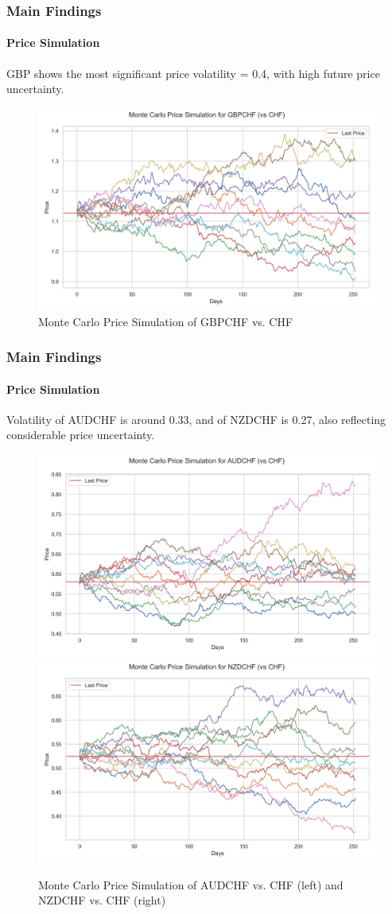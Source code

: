 \documentclass[10pt]{beamer}
\begin{document}
\begin{frame}
\frametitle{Main Findings}
\framesubtitle{Price Simulation}
GBP shows the most significant price volatility = 0.4, with high future price uncertainty.
\begin{figure}[h]
    \centering  \includegraphics[width=0.75\linewidth]{reports/figures/monte_carlo_price_simulation_GBPCHF_vs_CHF.png}
    \caption{Monte Carlo Price Simulation of GBPCHF vs. CHF}  \label{fig:monte_carlo_price_simulation_GBPCHF_vs_CHF}
\end{figure}
\end{frame}
\begin{frame}
\frametitle{Main Findings}
\framesubtitle{Price Simulation}
Volatility of AUDCHF is around 0.33, and of NZDCHF is 0.27, also reflecting considerable price uncertainty.
\begin{figure}[h]
    \centering
    \includegraphics[width=0.48\linewidth]{reports/figures/monte_carlo_price_simulation_AUDCHF_vs_CHF.png}    \label{fig:monte_carlo_price_simulation_AUDCHF_vs_CHF}
    \includegraphics[width=0.48\linewidth]{reports/figures/monte_carlo_price_simulation_NZDCHF_vs_CHF.png}  \label{fig:monte_carlo_price_simulation_NZDCHF_vs_CHF}
    \caption{Monte Carlo Price Simulation of AUDCHF vs. CHF (left) and NZDCHF vs. CHF (right)} 
\end{figure}
\end{frame}
\end{document}
